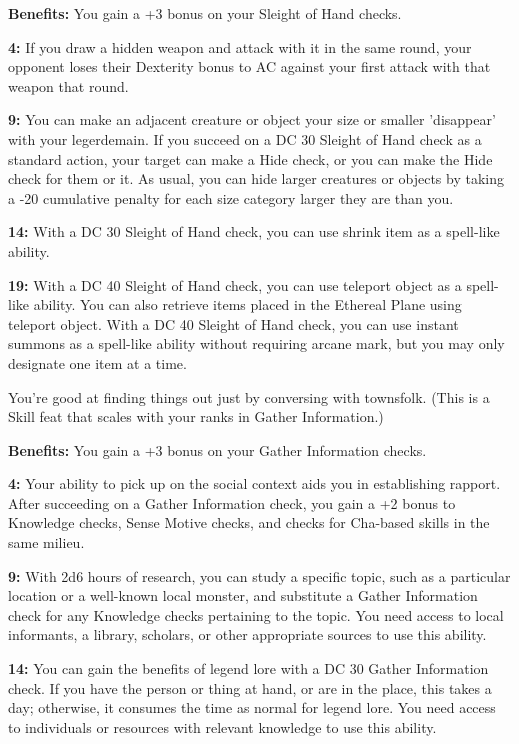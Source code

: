 \textbf{Benefits:} You gain a +3 bonus on your Sleight of Hand checks.

\textbf{4:} If you draw a hidden weapon and attack with it in the same round, your opponent loses their Dexterity bonus to AC against your first attack with that weapon that round.

\textbf{9:} You can make an adjacent creature or object your size or smaller 'disappear' with your legerdemain. If you succeed on a DC 30 Sleight of Hand check as a standard action, your target can make a Hide check, or you can make the Hide check for them or it. As usual, you can hide larger creatures or objects by taking a -20 cumulative penalty for each size category larger they are than you.

\textbf{14:} With a DC 30 Sleight of Hand check, you can use shrink item as a spell-like ability.

\textbf{19:} With a DC 40 Sleight of Hand check, you can use teleport object as a spell-like ability. You can also retrieve items placed in the Ethereal Plane using teleport object. With a DC 40 Sleight of Hand check, you can use instant summons as a spell-like ability without requiring arcane mark, but you may only designate one item at a time.


You're good at finding things out just by conversing with townsfolk. (This is a Skill feat that scales with your ranks in Gather Information.)

\textbf{Benefits:} You gain a +3 bonus on your Gather Information checks.

\textbf{4:} Your ability to pick up on the social context aids you in establishing rapport. After succeeding on a Gather Information check, you gain a +2 bonus to Knowledge checks, Sense Motive checks, and checks for Cha-based skills in the same milieu.

\textbf{9:} With 2d6 hours of research, you can study a specific topic, such as a particular location or a well-known local monster, and substitute a Gather Information check for any Knowledge checks pertaining to the topic. You need access to local informants, a library, scholars, or other appropriate sources to use this ability.

\textbf{14:} You can gain the benefits of legend lore with a DC 30 Gather Information check. If you have the person or thing at hand, or are in the place, this takes a day; otherwise, it consumes the time as normal for legend lore. You need access to individuals or resources with relevant knowledge to use this ability.

